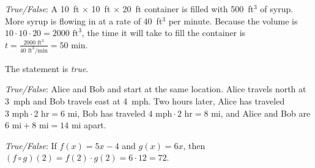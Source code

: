 \documentclass[11pt,letterpaper]{article}
\begin{document}
\quizsol \textit{True/False}: A 10~ft $\times$ 10~ft $\times$ 20~ft container is filled with 500~ft$^3$ of syrup. More syrup is flowing in at a rate of 40~ft$^3$ per minute. Because the volume is $10 \cdot 10 \cdot 20= 2000 \text{ ft}^3$, the time it will take to fill the container is $t= \frac{2000 \text{ ft}^3}{40 \text{ ft}^3/\text{min}}= 50 \text{ min}$. \pspace

\sol The statement is \textit{true}.


\quizsol \textit{True/False}: Alice and Bob and start at the same location. Alice travels north at 3~mph and Bob travels east at 4~mph. Two hours later, Alice has traveled $3 \text{ mph} \cdot 2 \text{ hr}= 6 \text{ mi}$, Bob has traveled $4 \text{ mph} \cdot 2 \text{ hr}= 8 \text{ mi}$, and Alice and Bob are $6 \text{ mi} + 8 \text{ mi}= 14 \text{ mi}$ apart. \pspace

\quizsol \textit{True/False}: If $f(x)= 5x - 4$ and $g(x)= 6x$, then $(f \circ g)(2)= f(2) \cdot g(2)= 6 \cdot 12= 72$. \pspace








\end{document}
